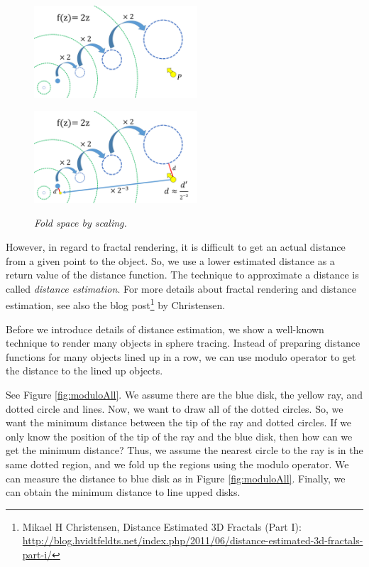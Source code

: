 \begin{figure}[htbp]
 \begin{minipage}[t]{0.5\hsize}
  \center
  \includegraphics[height=1.35in, keepaspectratio]{img/visualization/scaling1.png}
  \subcaption{\textit{}}
  \label{fig:iisScale1}
  \hspace*{\fill}
 \end{minipage}
 \begin{minipage}[t]{0.5\hsize}
  \center
  \includegraphics[height=1.35in, keepaspectratio]{img/visualization/scaling2.png}
  \subcaption{\textit{}}
  \label{fig:iisScale2}
  \hspace*{\fill}
 \end{minipage}
 \caption{\textit{Fold space by scaling.}}
 \label{fig:iisScaleAll}
\end{figure}

\noindent However, in regard to fractal rendering, it is difficult to
get an actual distance from a given point to the object.
So, we use a lower estimated distance
as a return value of the distance function. The technique to approximate
a distance is called \textit{distance estimation}.
For more details about fractal rendering and distance estimation, see also the blog
post\footnote{Mikael H Christensen, Distance Estimated 3D Fractals (Part I):\\ \quad\quad
\url{http://blog.hvidtfeldts.net/index.php/2011/06/distance-estimated-3d-fractals-part-i/}}
by Christensen. 

Before we introduce details of distance estimation, we show
a well-known technique to render many objects in sphere tracing.
Instead of preparing distance functions for many objects lined up in a
row, we can use modulo operator
to get the distance to the lined up objects.

See Figure \ref{fig:moduloAll}. 
We assume there are the blue disk, the
yellow ray, and dotted circle and lines.
Now, we want to draw all of the dotted circles.
So, we want the minimum distance between the tip of the ray and dotted circles.
If we only know the position of the tip of the ray and the blue disk,
then
how can we get the minimum distance?
Thus, we assume the nearest circle to the ray is in the same dotted region, and
we fold up the regions using the modulo operator.
We can measure the distance to blue disk as in Figure \ref{fig:moduloAll}.
Finally, we can obtain the minimum distance to line upped disks.

